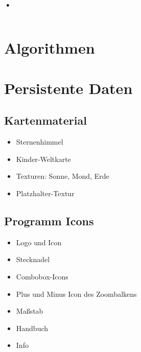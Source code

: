 \documentclass[10pt]{scrreprt}
\begin{document}
\subsection*{•}
\begin{lstlisting}
\end{lstlisting}

\chapter{Algorithmen}



\chapter{Persistente Daten}

\section{Kartenmaterial}
\begin{itemize}
\item Sternenhimmel
\item Kinder-Weltkarte
\item Texturen: Sonne, Mond, Erde
\item Platzhalter-Textur
\end{itemize}

\section{Programm Icons}
\begin{itemize}
\item Logo und Icon
\item Stecknadel
\item Combobox-Icons
\item Plus und Minus Icon des Zoombalkens
\item Maßstab
\item Handbuch
\item Info
\end{itemize}
\end{document}

